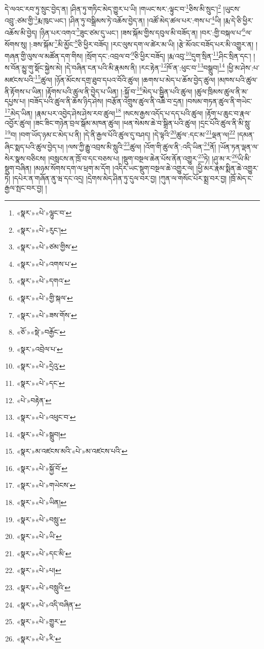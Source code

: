 དེ་ལའང་རབ་ཏུ་སྲུང་བྱེད་ན། །ཤིན་ཏུ་གཏིང་མེད་གྱུར་པ་ཡི། །གཡང་སར་:ལྟུང་བ་\footnote{«སྣར་»«པེ་»ལྷུང་བ་}ཅིས་མི་སྲུང་།\footnote{«སྣར་»«པེ་»རུང་།} །ཡུངས་འབྲུ་:ཙམ་གྱི་\footnote{«སྣར་»«པེ་»ཙམ་གྱིས་}རྨ་ཁུང་ཡང་། །ཤིན་ཏུ་བསྒྲིམས་ཏེ་འཆོས་བྱེད་ན། །འཚོ་མེད་ཚལ་པར་:གས་པ་\footnote{«སྣར་»«པེ་»འགས་པ་}ཡི། །རྨ་དེ་ཅི་ཕྱིར་འཆོས་མི་བྱེད། །ཉིན་པར་འགའ་\footnote{«སྣར་»«པེ་»དགའ་}ཟུང་ཙམ་དུ་ཡང་། །ཟས་སྐོམ་གྱིས་དབུལ་མི་བཟོད་ན། །བར་:གྱི་བསྐལ་པ་\footnote{«སྣར་»«པེ་»གྱི་སྐལ་}ལ་སོགས་སུ། །:ཟས་སྐོམ་\footnote{«སྣར་»«པེ་»ཟས་གོས་}མི་མྱོང་\footnote{«ཅོ་»«སྡེ་»བརྒྱོང་}ཅི་ཕྱིར་བཟོད། །རང་ལུས་དག་ལ་ཚེར་མ་ཡི། །རྩེ་མོའང་བཟོད་པར་མི་འགྱུར་ན། །གཞན་གྱི་ལུས་ལ་མཚོན་དག་གིས། །སྲོག་དང་:འབྲལ་བ་\footnote{«སྣར་»འབྲེལ་པ་}ཅི་ཕྱིར་བཟོད། །རྨ་འབུ་\footnote{«སྣར་»«པེ་»དྲེའུ་}དུག་སྲིན་\footnote{«སྣར་»«པེ་»དང་}ཤིང་སྲིན་དང་། །ས་བོན་མྱུ་གུ་སྡོང་སྐྱེས་མེ། །དེ་བཞིན་ངན་པའི་མི་རྣམས་ནི། །རང་རྟེན་\footnote{«པེ་»བརྟེན་}ཁོ་ན་:ཕུང་བ་\footnote{«སྣར་»«པེ་»འཕུང་བ་}བསྒྲུབ།\footnote{«སྣར་»«པེ་»སྒྲུབ།} །ཕྱི་མ་ཤེས་:པ་མཛངས་པའི་\footnote{«སྣར་»མ་འཛངས་མའི་«པེ་»མ་འཛངས་པའི་}ཚུལ། །ཉོན་མོངས་དགྲ་ཐུབ་དཔའ་བོའི་ཚུལ། །ཆགས་པ་མེད་པ་ཆོས་བྱེད་ཚུལ། །མཁས་པའི་ཚུལ་ནི་རྟོགས་པ་ཡིན། །རྟོགས་པའི་ཚུལ་ནི་བྱེད་པ་ཡིན། །:སྐྱོ་བ་\footnote{«སྣར་»«པེ་»སྐྱོ་བོ་}མེད་པ་སྦྱིན་པའི་ཚུལ། །ཚུལ་ཁྲིམས་ཚུལ་ནི་མ་དཔྱས་པ། །བཟོད་པའི་ཚུལ་ནི་ཆོས་ཉིད་ཤེས། །བརྩོན་འགྲུས་ཚུལ་ནི་འཆི་བ་དྲན། །བསམ་གཏན་ཚུལ་ནི་གཡེང་\footnote{«སྣར་»«པེ་»གཡེངས་}མེད་ཡིན། །རྣམ་པར་འབྱེད་ཤེས་ཤེས་རབ་ཚུལ།\footnote{«སྣར་»«པེ་»ཡིན།} །སངས་རྒྱས་འདོད་པ་དད་པའི་ཚུལ། །རྟོག་པ་ཆུང་བ་རྣལ་འབྱོར་ཚུལ། །ཟང་ཟིང་གཉེན་བྲལ་སྒོམ་མཁན་ཚུལ། །ཕན་སེམས་ཆེ་བ་སྒྲིན་པའི་ཚུལ། །དྲང་པོའི་ཚུལ་ནི་མི་སླུ་\footnote{«སྣར་»«པེ་»བསླུ་}བ། །བག་ཡོད་ཉམ་ང་མེད་པ་ནི། །དེ་ནི་རྒྱལ་པོའི་ཚུལ་དུ་བཤད། །དེ་ལྟའི་\footnote{«སྣར་»«པེ་»ཡི་}ཚུལ་:དང་མ་\footnote{«སྣར་»«པེ་»དང་མི་}ལྡན་ལ།\footnote{«སྣར་»«པེ་»པ།} །དམན་ཞིང་སྨད་པའི་ཚུལ་བྱེད་པ། །ལས་ཀྱི་རྒྱུ་འབྲས་མི་སླུའི་\footnote{«སྣར་»«པེ་»བསླུའི་}ཚུལ། །འོག་གི་ཚུལ་ནི་:འདི་ཡིན་\footnote{«སྣར་»«པེ་»འདི་བཞིན་}ནོ། །ཡོན་ཏན་ལྡན་ལ་སེར་སྣས་བཅིངས། །བསླངས་ན་ཁྲོ་བ་དང་བཅས་པ། །སྡུག་བསྔལ་ཆེན་པོས་ནོན་འགྱུར་\footnote{«སྣར་»«པེ་»གྱུར་}ཏེ། །ཤུ་མ་ར་\footnote{«སྣར་»«པེ་»རི་}ཡི་མི་སྡུག་བཞིན། །མཉམ་སོགས་དག་ལ་ཕྲག་མ་དོག །འདིར་ཡང་སྡུག་བསྔལ་ཆེ་འགྱུར་ལ། །ཕྱི་མར་རྣམ་སྨིན་ཆེ་འགྱུར་ཏེ། །དཔེར་ན་གཞོན་ནུ་ཝ་དང་འདྲ། །དྲེགས་མེད་ཤིན་ཏུ་དུལ་བར་བྱ། །ཀུན་ལ་གསོང་པོར་སྨྲ་བར་བྱ། །ཁྲོ་མེད་ང་རྒྱལ་སྤང་བར་བྱ། །
